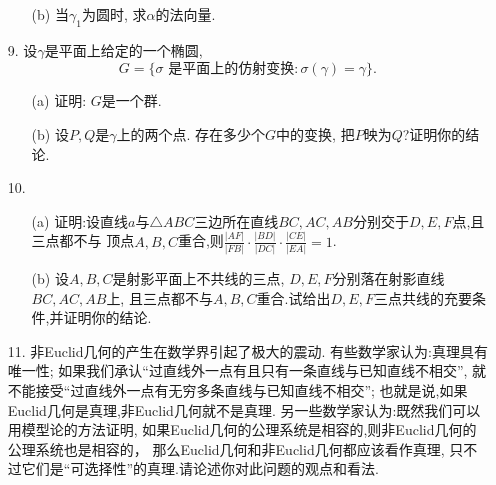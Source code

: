 \begin{itemize}
\begin{itemize}
        \item[(b)] 当$\gamma_1$为圆时, 求$\alpha$的法向量.
    \end{itemize}
    \item[9.] 设$\gamma$是平面上给定的一个椭圆,
    $$G=\{\sigma\text{ 是平面上的仿射变换}: \sigma(\gamma)=\gamma\}.$$
    \begin{itemize}
        \item[(a)] 证明: $G$是一个群.
        \item[(b)] 设$P,Q$是$\gamma$上的两个点. 存在多少个$G$中的变换, 把$P$映为$Q$?证明你的结论.
    \end{itemize}
    \item[10.] 
    \begin{itemize}
        \item[(a)] 证明:设直线$a$与$\triangle ABC$三边所在直线$BC,AC,AB$分别交于$D,E,F$点,且三点都不与
        顶点$A,B,C$重合,则$\frac{|AF|}{|FB|}\cdot\frac{|BD|}{|DC|}\cdot\frac{|CE|}{|EA|}=1$.
        \item[(b)] 设$A,B,C$是射影平面上不共线的三点, $D,E,F$分别落在射影直线$BC,AC,AB$上,
        且三点都不与$A,B,C$重合.试给出$D,E,F$三点共线的充要条件,并证明你的结论.
    \end{itemize}
    \item[11.] 非Euclid几何的产生在数学界引起了极大的震动.
    有些数学家认为:真理具有唯一性;
    如果我们承认``过直线外一点有且只有一条直线与已知直线不相交'',
    就不能接受``过直线外一点有无穷多条直线与已知直线不相交'';
    也就是说,如果Euclid几何是真理,非Euclid几何就不是真理.
    另一些数学家认为:既然我们可以用模型论的方法证明,
    如果Euclid几何的公理系统是相容的,则非Euclid几何的公理系统也是相容的，
    那么Euclid几何和非Euclid几何都应该看作真理,
    只不过它们是``可选择性''的真理.请论述你对此问题的观点和看法.
\end{itemize}
~\\




\begin{center}
\end{center}

